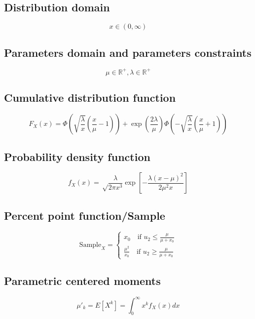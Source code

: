 \documentclass{article}
\begin{document}
\subsection{Distribution domain}
\begin{equation*} x\in\left(0,\infty\right) \end{equation*}
\subsection{Parameters domain and parameters constraints}
\begin{equation*} \mu\in\mathbb{R}^{+}, \lambda\in\mathbb{R}^{+} \end{equation*}
\subsection{Cumulative distribution function}
\begin{equation*} F_{X}\left(x\right)=\Phi\left(\sqrt{\frac{\lambda}{x}}\left(\frac{x}{\mu}-1\right)\right)+\exp\left(\frac{2 \lambda}{\mu}\right) \Phi\left(-\sqrt{\frac{\lambda}{x}}\left(\frac{x}{\mu}+1\right)\right) \end{equation*}
\subsection{Probability density function}
\begin{equation*} f_{X}\left(x\right)=\sqrt\frac{\lambda}{2 \pi x^3} \exp\left[-\frac{\lambda (x-\mu)^2}{2 \mu^2 x}\right] \end{equation*}
\subsection{Percent point function/Sample}
\begin{equation*} \text{Sample}_{X}=\left\{\begin{array}{cl} x_{0} \quad \text{if } u_{2}\leqslant\frac{\mu}{\mu+x_{0}}\\ \frac{\mu^{2}}{x_{0}} \quad \text{if } u_{2}\geqslant \frac{\mu}{\mu+x_{0}} \end{array} \right. \end{equation*}
\subsection{Parametric centered moments}
\begin{equation*} \mu'_{k}=E[X^k]=\int_{0}^{\infty }x^{k}f_{X}\left(x\right)dx \end{equation*}
\end{document}
